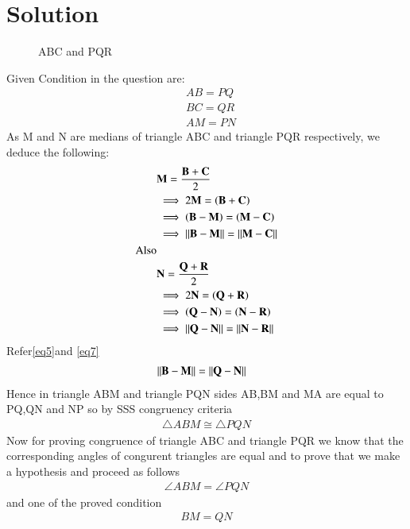 \documentclass[journal,12pt,twocolumn]{IEEEtran}
\begin{document}
\section{ Solution}
\renewcommand{\thefigure}{1}
\begin{figure}[hb]
	\centering
	\centering
	\resizebox{\columnwidth}{!}{}
	\caption{\triangle ABC and \triangle PQR}
	\label{myfig}
\end{figure}
Given Condition in the question are:
\begin{align}
&AB = PQ\label{eq1} \\
&BC = QR\label{eq2} \\
&AM = PN\label{eq3}
\end{align}
As M and N are medians of triangle ABC and triangle PQR respectively, we deduce the following:
\begin{align}
&\mathbf{M} = \frac{\mathbf{B}+\mathbf{C}}{2} \\
&\implies 2\mathbf{M} = \left(\mathbf{B+C}\right)\\
&\implies\left(\mathbf{B-M}\right) = \left(\mathbf{M-C}\right)\\
&\implies\left\lVert\mathbf{B}-\mathbf{M}\right\rVert=\left\lVert\mathbf{M}-\mathbf{C}\right\rVert\label{eq5} \\
\text{Also}\\
&\mathbf{N} = \frac{\mathbf{Q}+\mathbf{R}}{2}\label{eq6} \\
&\implies2\mathbf{N} = \left(\mathbf{Q+R}\right)\\
&\implies\left(\mathbf{Q-N}\right) = \left(\mathbf{N-R}\right)\\
&\implies\left\lVert\mathbf{Q}-\mathbf{N}\right\rVert=\left\lVert\mathbf{N}-\mathbf{R}\right\rVert\label{eq7}
\end{align}
Refer\eqref{eq5}and \eqref{eq7}
\begin{align}
&\left\lVert\mathbf{B}-\mathbf{M}\right\rVert= \left\lVert\mathbf{Q}-\mathbf{N}\right\rVert
\end{align}
Hence in triangle ABM and triangle PQN sides AB,BM and MA are equal to PQ,QN and NP so by SSS congruency criteria 
\begin{align}
    \triangle{ABM}\cong\triangle{PQN}\label{eqA}
\end{align}
Now for proving congruence of triangle ABC and triangle PQR we know that the corresponding angles of congurent triangles are equal and to prove that we make a hypothesis and proceed as follows
\begin{align}
\angle ABM = \angle PQN\label{eq8} 
\end{align} 
and one of the proved condition
\begin{align}
  BM=QN\label{eq9}  
\end{align}
\end{document}
